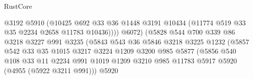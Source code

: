 \begin{lexlean}{RustCore}
\begin{coremodule}
                                          @3192
                                          @5910
                                          (@10425
                                            @692
                                            @33
                                            @36
                                            @1448
                                            @3191
                                            @10434
                                            (@11774 @519 @33 @35 @2234 @2658 @11783 @10436))))
                                      @6072)
                                    (@5828
                                      @544
                                      @700
                                      @339
                                      @86
                                      @3218
                                      @3227
                                      @991
                                      @3235
                                      (@5843
                                        @543
                                        @36
                                        @5846
                                        @3218
                                        @3225
                                        @1232
                                        (@5857
                                          @542
                                          @33
                                          @35
                                          @1015
                                          @3217
                                          @3224
                                          @1209
                                          @3200
                                          @985
                                          @5877
                                          (@5856
                                            @540
                                            @108
                                            @33
                                            @11
                                            @2234
                                            @991
                                            @1019
                                            @1209
                                            @3210
                                            @985
                                            @11783
                                            @5917
                                            @5920
                                            (@4955 (@5922 @3211 @991)))
                                          @5920

\end{coremodule}
\end{lexlean}

